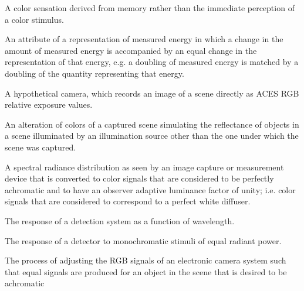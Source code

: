 A color sensation derived from memory rather than the immediate perception of a color stimulus.

An attribute of a representation of measured energy in which a change in the amount of measured energy is accompanied by an equal change in the representation of that energy, e.g. a doubling of measured energy is matched by a doubling of the quantity representing that energy.

A hypothetical camera, which records an image of a scene directly as ACES RGB relative exposure values.

An alteration of colors of a captured scene simulating the reflectance of objects in a scene illuminated by an illumination source other than the one under which the scene was captured.

A spectral radiance distribution as seen by an image capture or measurement device that is converted to color signals that are considered to be perfectly achromatic and to have an observer adaptive luminance factor of unity; i.e. color signals that are considered to correspond to a perfect white diffuser.

The response of a detection system as a function of wavelength.

The response of a detector to monochromatic stimuli of equal radiant power.

The process of adjusting the RGB signals of an electronic camera system such that equal signals are produced for an object in the scene that is desired to be achromatic